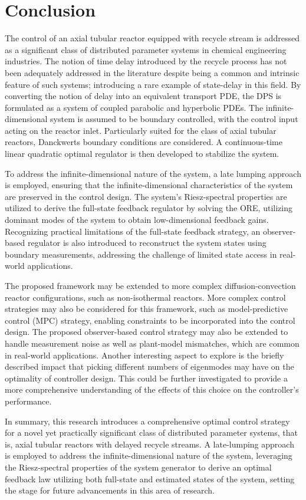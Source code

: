 \section{Conclusion}

The control of an axial tubular reactor equipped with recycle stream is addressed as a significant class of distributed parameter systems in chemical engineering industries. The notion of time delay introduced by the recycle process has not been adequately addressed in the literature despite being a common and intrinsic feature of such systems; introducing a rare example of state-delay in this field. By converting the notion of delay into an equivalent transport PDE, the DPS is formulated as a system of coupled parabolic and hyperbolic PDEs. The infinite-dimensional system is assumed to be boundary controlled, with the control input acting on the reactor inlet. Particularly suited for the class of axial tubular reactors, Danckwerts boundary conditions are considered. A continuous-time linear quadratic optimal regulator is then developed to stabilize the system.

To address the infinite-dimensional nature of the system, a late lumping approach is employed, ensuring that the infinite-dimensional characteristics of the system are preserved in the control design. The system's Riesz-spectral properties are utilized to derive the full-state feedback regulator by solving the ORE, utilizing dominant modes of the system to obtain low-dimensional feedback gains. Recognizing practical limitations of the full-state feedback strategy, an observer-based regulator is also introduced to reconstruct the system states using boundary measurements, addressing the challenge of limited state access in real-world applications.

The proposed framework may be extended to more complex diffusion-convection reactor configurations, such as non-isothermal reactors. More complex control strategies may also be considered for this framework, such as model-predictive control (MPC) strategy, enabling constraints to be incorporated into the control design. The proposed observer-based control strategy may also be extended to handle measurement noise as well as plant-model mismatches, which are common in real-world applications. Another interesting aspect to explore is the briefly described impact that picking different numbers of eigenmodes may have on the optimality of controller design. This could be further investigated to provide a more comprehensive understanding of the effects of this choice on the controller's performance.

In summary, this research introduces a comprehensive optimal control strategy for a novel yet practically significant class of distributed parameter systems, that is, axial tubular reactors with delayed recycle streams. A late-lumping approach is employed to address the infinite-dimensional nature of the system, leveraging the Riesz-spectral properties of the system generator to derive an optimal feedback law utilizing both full-state and estimated states of the system, setting the stage for future advancements in this area of research.